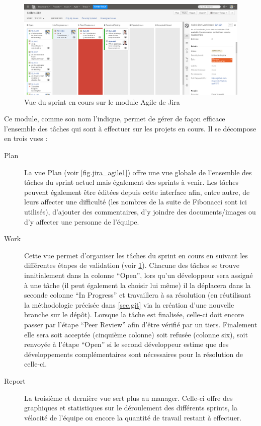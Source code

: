 \documentclass[12pt,a4paper]{book}
\begin{document}
\begin{figure}[htp]
\centering
\includegraphics[scale=.30]{img/jira_agile_2.png}
 \caption{Vue du sprint en cours sur le module Agile de Jira}
 \label{fig.jira_agile2}
\end{figure}

Ce module, comme son nom l'indique, permet de gérer de façon efficace l'ensemble des tâches qui sont à effectuer sur les projets en cours. Il se décompose en trois vues :

\begin{description}
  \item[Plan] La vue Plan (voir \cref{fig.jira_agile1}) offre une vue globale de l'ensemble des tâches du sprint actuel mais également des sprints à venir. Les tâches peuvent également être éditées depuis cette interface afin, entre autre, de leurs affecter une difficulté (les nombres de la suite de Fibonacci sont ici utilisés), d'ajouter des commentaires, d'y joindre des documents/images ou d'y affecter une personne de l'équipe.
  \item[Work] Cette vue permet d'organiser les tâches du sprint en cours en suivant les différentes étapes de validation (voir \cref{fig.jira_agile2}). Chacune des tâches se trouve innitialement dans la colonne ``Open'', lors qu'un développeur sera assigné à une tâche (il peut également la choisir lui même) il la déplacera dans la seconde colonne ``In Progress'' et travaillera à sa résolution (en réutilisant la méthodologie précisée dans \cref{sec.git} via la création d'une nouvelle branche sur le dépôt). Lorsque la tâche est finalisée, celle-ci doit encore passer par l'étape ``Peer Review'' afin d'être vérifié par un tiers. Finalement elle sera soit acceptée (cinquième colonne) soit refusée (colonne six), soit renvoyée à l'étape ``Open'' si le second développeur estime que des développements complémentaires sont nécessaires pour la résolution de celle-ci.
  \item[Report] La troisième et dernière vue sert plus au manager. Celle-ci offre des graphiques et statistiques sur le déroulement des différents sprints, la vélocité de l'équipe ou encore la quantité de travail restant à effectuer.
\end{description}
\end{document}
